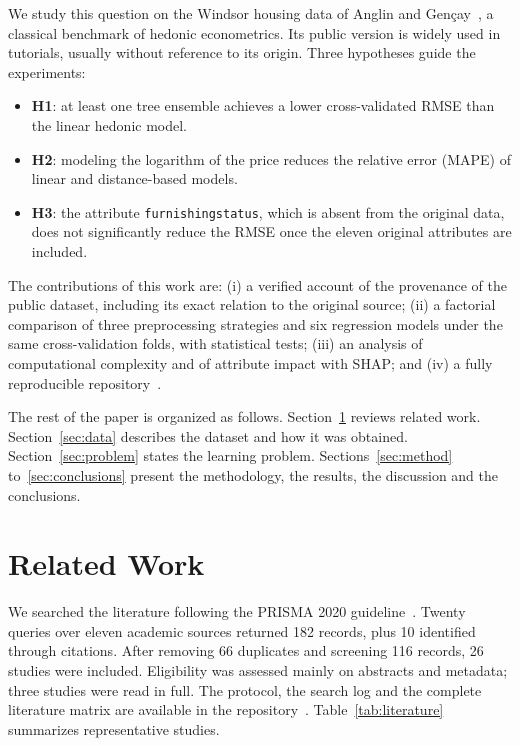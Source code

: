 \documentclass[conference]{IEEEtran}
\begin{document}
We study this question on the Windsor housing data of Anglin and Gen\c{c}ay~\cite{anglin1996}, a classical benchmark of hedonic econometrics. Its public version is widely used in tutorials, usually without reference to its origin. Three hypotheses guide the experiments:
\begin{itemize}
  \item \textbf{H1}: at least one tree ensemble achieves a lower cross-validated RMSE than the linear hedonic model.
  \item \textbf{H2}: modeling the logarithm of the price reduces the relative error (MAPE) of linear and distance-based models.
  \item \textbf{H3}: the attribute \texttt{furnishingstatus}, which is absent from the original data, does not significantly reduce the RMSE once the eleven original attributes are included.
\end{itemize}

The contributions of this work are: (i) a verified account of the provenance of the public dataset, including its exact relation to the original source; (ii) a factorial comparison of three preprocessing strategies and six regression models under the same cross-validation folds, with statistical tests; (iii) an analysis of computational complexity and of attribute impact with SHAP; and (iv) a fully reproducible repository~\cite{repo}.

The rest of the paper is organized as follows. Section~\ref{sec:related} reviews related work. Section~\ref{sec:data} describes the dataset and how it was obtained. Section~\ref{sec:problem} states the learning problem. Sections~\ref{sec:method} to~\ref{sec:conclusions} present the methodology, the results, the discussion and the conclusions.

\section{Related Work}
\label{sec:related}

We searched the literature following the PRISMA 2020 guideline~\cite{page2021}. Twenty queries over eleven academic sources returned 182 records, plus 10 identified through citations. After removing 66 duplicates and screening 116 records, 26 studies were included. Eligibility was assessed mainly on abstracts and metadata; three studies were read in full. The protocol, the search log and the complete literature matrix are available in the repository~\cite{repo}. Table~\ref{tab:literature} summarizes representative studies.
\end{document}
